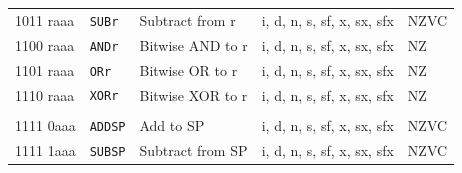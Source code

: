 \documentclass[10pt,fleqn]{book}
\begin{document}
\begin{tabular}{ l l l l l }
1011 raaa   & \verb|SUBr|    & Subtract from r                             & i, d, n, s, sf, x, sx, sfx  & NZVC \\
1100 raaa   & \verb|ANDr|    & Bitwise AND to r                            & i, d, n, s, sf, x, sx, sfx  & NZ \\
1101 raaa   & \verb|ORr|     & Bitwise OR to r                             & i, d, n, s, sf, x, sx, sfx  & NZ \\
1110 raaa   & \verb|XORr|    & Bitwise XOR to r                            & i, d, n, s, sf, x, sx, sfx  & NZ \\
 \\
1111 0aaa   & \verb|ADDSP|   & Add to SP                                   & i, d, n, s, sf, x, sx, sfx  & NZVC \\
1111 1aaa   & \verb|SUBSP|   & Subtract from SP                            & i, d, n, s, sf, x, sx, sfx  & NZVC \\
\bottomrule
\end{tabular}

\newpage

\end{document}
